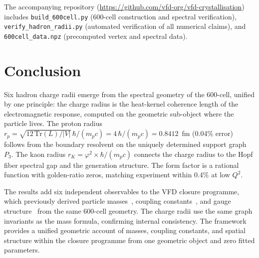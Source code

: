 \documentclass[12pt]{article}
\newcommand{\phig}{\varphi}
\begin{document}
\noindent The accompanying repository (\url{https://github.com/vfd-org/vfd-crystallisation}) includes \texttt{build\_600cell.py} (600-cell construction and spectral verification), \texttt{verify\_hadron\_radii.py} (automated verification of all numerical claims), and \texttt{600cell\_data.npz} (precomputed vertex and spectral data).

\section{Conclusion}\label{sec:conclusion}

Six hadron charge radii emerge from the spectral geometry of the 600-cell, unified by one principle: the charge radius is the heat-kernel coherence length of the electromagnetic response, computed on the geometric sub-object where the particle lives. The proton radius $r_p = \sqrt{12\,\mathrm{Tr}(L)/|V|}\,\hbar/(m_p c) = 4\,\hbar/(m_p c) = 0.8412$~fm (0.04\% error) follows from the boundary resolvent on the uniquely determined support graph $P_3$. The kaon radius $r_K = \phig^2 \times \hbar/(m_p c)$ connects the charge radius to the Hopf fiber spectral gap and the generation structure. The form factor is a rational function with golden-ratio zeros, matching experiment within 0.4\% at low $Q^2$.

The results add six independent observables to the VFD closure programme, which previously derived particle masses~\citep{SmartIV, SmartV}, coupling constants~\citep{SmartXXII}, and gauge structure~\citep{SmartVI, SmartXXII} from the same 600-cell geometry. The charge radii use the same graph invariants as the mass formula, confirming internal consistency. The framework provides a unified geometric account of masses, coupling constants, and spatial structure within the closure programme from one geometric object and zero fitted parameters.



\end{document}

